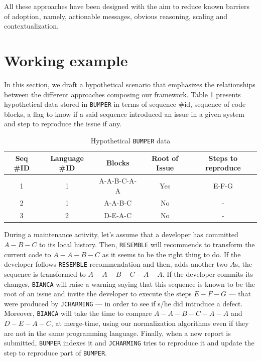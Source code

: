 All these approaches have been designed with the aim to reduce known barriers of adoption, namely, actionable messages, obvious reasoning, scaling and contextualization\cite{Johnson2013, Hovemeyer2004, Lopez2011, Lewis2013}.

\section{Working example\label{sec:pasmast-example}}

In this section, we draft a hypothetical scenario that emphasizes the relationships between the different approaches composing our framework. Table \ref{tab:bumper-hypo} presents hypothetical data stored in {\tt BUMPER} in terms of sequence \#id, sequence of code blocks, a flag to know if a said sequence introduced an issue in a given system and step to reproduce the issue if any.

\begin{table}[h!]
\centering
\begin{tabular}{c|c|c|c|c}
Seq \#ID & Language \#ID & Blocks & Root of Issue & Steps to reproduce \\ \hline \hline
1        & 1             & A-A-B-C-A-A   & Yes  & E-F-G         \\
2        & 1             & A-A-B-C       & No   & -         \\
3        & 2             & D-E-A-C       & No &  - \\ \hline \hline
\end{tabular}
\caption{Hypothetical {\tt BUMPER} data}
\label{tab:bumper-hypo}
\end{table}

During a maintenance activity, let's assume that a developer has committed $A-B-C$ to its local history.
Then, {\tt RESEMBLE} will recommends to transform the current code to $A-A-B-C$ as it seems to be the right thing to do.
If the developer follows {\tt RESEMBLE} recommendation and then, adds another two $A$s, the sequence is transformed to $A-A-B-C-A-A$.
If the developer commits its changes, {\tt BIANCA} will raise a warning saying that this sequence is known to be the root of an issue and invite the developer to execute the steps $E-F-G$ --- that were produced by {\tt JCHARMING} --- in order to see if s/he did introduce a defect.
Moreover, {\tt BIANCA} will take the time to compare $A-A-B-C-A-A$ and $D-E-A-C$, at merge-time, using our normalization algorithms even if they are not in the same programming language.
Finally, when a new report is submitted, {\tt BUMPER} indexes it and {\tt JCHARMING} tries to reproduce it and update the step to reproduce part of {\tt BUMPER}.

